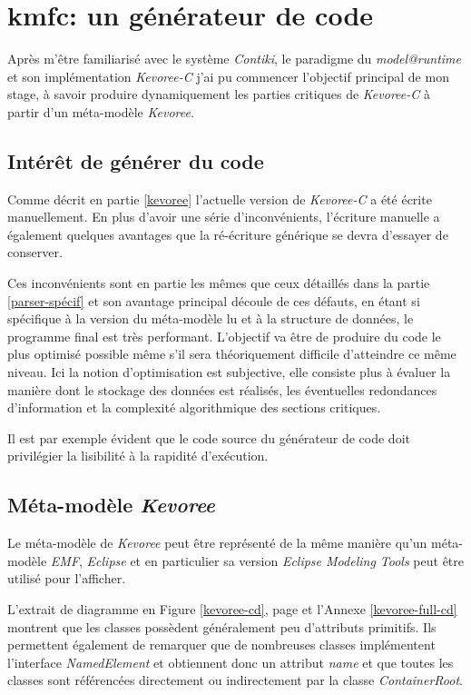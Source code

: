 \section{kmfc: un générateur de code}

Après m'être familiarisé avec le système \emph{Contiki}, le paradigme du \emph{model@runtime} et son implémentation \emph{Kevoree-C} j'ai pu commencer l'objectif principal de mon stage, à savoir produire dynamiquement les parties critiques de \emph{Kevoree-C} à partir d'un méta-modèle \emph{Kevoree}.

\subsection{Intérêt de générer du code}

Comme décrit en partie \ref{kevoree} l'actuelle version de \emph{Kevoree-C} a été écrite manuellement. En plus d'avoir une série d'inconvénients, l'écriture manuelle a également quelques avantages que la ré-écriture générique se devra d'essayer de conserver.

Ces inconvénients sont en partie les mêmes que ceux détaillés dans la partie \ref{parser-spécif} et son avantage principal découle de ces défauts, en étant si spécifique à la version du méta-modèle lu et à la structure de données, le programme final est très performant. L'objectif va être de produire du code le plus optimisé possible même s'il sera théoriquement difficile d'atteindre ce même niveau. Ici la notion d'optimisation est subjective, elle consiste plus à évaluer la manière dont le stockage des données est réalisés, les éventuelles redondances d'information et la complexité algorithmique des sections critiques.

Il est par exemple évident que le code source du générateur de code doit privilégier la lisibilité à la rapidité d'exécution.

\subsection{\label{mm-kevoree}Méta-modèle \emph{Kevoree}}

Le méta-modèle de \emph{Kevoree} peut être représenté de la même manière qu'un méta-modèle \emph{EMF}, \emph{Eclipse}\cite{eclipse} et en particulier sa version \emph{Eclipse Modeling Tools}\cite{eclipse-emf} peut être utilisé pour l'afficher. 

L'extrait de diagramme en Figure \ref{kevoree-cd}, page \pageref{kevoree-cd} et l'Annexe \ref{kevoree-full-cd} montrent que les classes possèdent généralement peu d'attributs primitifs. Ils permettent également de remarquer que de nombreuses classes implémentent l'interface \emph{NamedElement} et obtiennent donc un attribut \emph{name} et que toutes les classes sont référencées directement ou indirectement par la classe \emph{ContainerRoot}.


